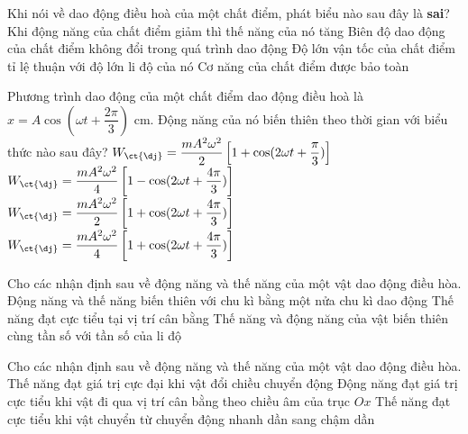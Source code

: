 \begin{ex}%
Khi nói về dao động điều hoà của một chất điểm, phát biểu nào sau đây là \textbf{sai}?
\choice
{Khi động năng của chất điểm giảm thì thế năng của nó tăng}
{Biên độ dao động của chất điểm không đổi trong quá trình dao động}
{\True Độ lớn vận tốc của chất điểm tỉ lệ thuận với độ lớn li độ của nó}
{Cơ năng của chất điểm được bảo toàn}
\end{ex} 
\begin{ex}
Phương trình dao động của một chất điểm dao động điều hoà là $x=A\cos(\omega t+\dfrac{2\pi}{3})$ cm. Động năng của nó biến thiên theo thời gian với biểu thức nào sau đây?
\choice
{$W_{\ct{đ}}=\dfrac{mA^2\omega^2}{2}\left[1+\cos(2\omega t+\dfrac{\pi}{3})\right]$}
{$W_{\ct{đ}}=\dfrac{mA^2\omega^2}{4}\left[1-\cos(2\omega t+\dfrac{4\pi}{3})\right]$}
{$W_{\ct{đ}}=\dfrac{mA^2\omega^2}{2}\left[1+\cos(2\omega t+\dfrac{4\pi}{3})\right]$}
{\True $W_{\ct{đ}}=\dfrac{mA^2\omega^2}{4}\left[1+\cos(2\omega t+\dfrac{4\pi}{3})\right]$}
\end{ex} 
\begin{ex}
Cho các nhận định sau về động năng và thế năng của một vật dao động điều hòa.
{\True Động năng và thế năng biến thiên với chu kì bằng một nửa chu kì dao động}
{\True Thế năng đạt cực tiểu tại vị trí cân bằng}
{Thế năng và động năng của vật biến thiên cùng tần số với tần số của li độ}
\loigiai{
\begin{itemchoice}
\itemch
\itemch
\itemch
\itemch
\end{itemchoice}

}
\end{ex} 

\begin{ex}
Cho các nhận định sau về động năng và thế năng của một vật dao động điều hòa.
{\True Thế năng đạt giá trị cực đại khi vật đổi chiều chuyển động}
{Động năng đạt giá trị cực tiểu khi vật đi qua vị trí cân bằng theo chiều âm của trục $O x$}
{\True Thế năng đạt cực tiểu khi vật chuyển từ chuyển động nhanh dần sang chậm dần}
\loigiai{
\begin{itemchoice}
\itemch
\itemch
\itemch
\itemch
\end{itemchoice}

}
\end{ex} 


